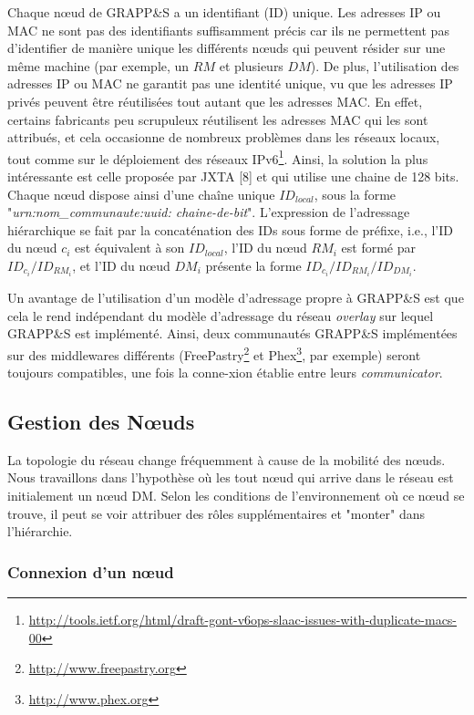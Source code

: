 Chaque n{\oe}ud de GRAPP\&S a un identifiant (ID) unique. Les adresses IP ou MAC ne sont pas des identifiants suffisamment précis car ils ne permettent pas d'identifier de manière unique les différents n{\oe}uds qui peuvent résider sur une même machine (par exemple, un $RM$ et plusieurs $DM$). De plus, l'utilisation des adresses IP ou MAC ne garantit pas une identité unique, vu que les adresses IP privés peuvent être réutilisées tout autant que les adresses MAC. En effet, certains fabricants peu scrupuleux réutilisent les adresses MAC qui les sont attribués, et cela occasionne de nombreux problèmes dans les réseaux locaux, tout comme sur le déploiement des réseaux IPv6\footnote{\url{http://tools.ietf.org/html/draft-gont-v6ops-slaac-issues-with-duplicate-macs-00}}. Ainsi, la solution la plus intéressante est celle proposée par JXTA [8] et qui utilise une chaine de 128 bits. Chaque n{\oe}ud dispose ainsi d'une chaîne unique $ID_{local}$, sous la forme "\textit{urn:nom\_communaute:uuid: chaine-de-bit}". L'expression de l'adressage hiérarchique se fait par la concaténation des IDs sous forme de préfixe, i.e., l'ID du n{\oe}ud $c_i$ est équivalent à son $ID_{local}$, l'ID du n{\oe}ud $RM_i$ est formé par $ID_{c_i}/ID_{RM_i}$, et l'ID du n{\oe}ud $DM_i$ présente la forme $ID_{c_i}/ID_{RM_i}/ID_{DM_i}$.

Un avantage de l'utilisation d'un modèle d'adressage propre à GRAPP\&S est que cela le rend indépendant du modèle d'adressage du réseau \textit{overlay} sur lequel GRAPP\&S est implémenté. Ainsi, deux communautés GRAPP\&S implémentées sur des middlewares différents (FreePastry\footnote{\url{http://www.freepastry.org}} et Phex\footnote{\url{http://www.phex.org}}, par exemple) seront toujours compatibles, une fois la conne-xion établie entre leurs \textit{communicator}. 
\pagebreak
\subsection{Gestion des N{\oe}uds}
La topologie du réseau change fréquemment à cause de la mobilité des n{\oe}uds. Nous travaillons dans l'hypothèse où les tout n{\oe}ud qui arrive dans le réseau est initialement un n{\oe}ud DM. Selon les conditions de l'environnement où ce n{\oe}ud se trouve, il peut se voir attribuer des rôles supplémentaires et "monter" dans l'hiérarchie.

\subsubsection{Connexion d'un n{\oe}ud}

